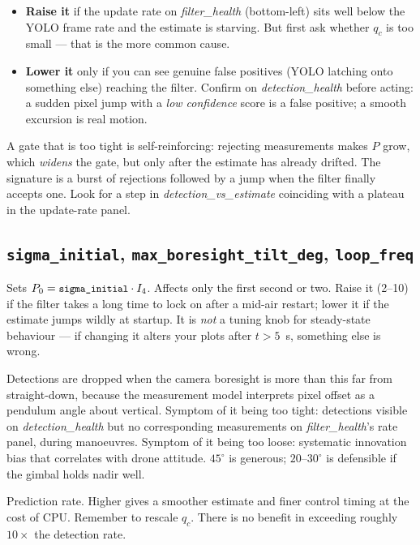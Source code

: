 \documentclass[11pt,a4paper]{article}
\newcommand{\param}[1]{\texttt{\small #1}}
\newcommand{\plot}[1]{\textit{#1}}
\begin{document}
\begin{itemize}[nosep]
  \item \textbf{Raise it} if the update rate on \plot{filter\_health}
        (bottom-left) sits well below the YOLO frame rate and the estimate is
        starving. But first ask whether $q_c$ is too small --- that is the more
        common cause.
  \item \textbf{Lower it} only if you can see genuine false positives (YOLO
        latching onto something else) reaching the filter. Confirm on
        \plot{detection\_health} before acting: a sudden pixel jump with a
        \emph{low confidence} score is a false positive; a smooth excursion is
        real motion.
\end{itemize}

\begin{tcolorbox}[colback=red!4,colframe=red!45!black,title=\textbf{Failure mode worth knowing},fonttitle=\bfseries\small]
A gate that is too tight is self-reinforcing: rejecting measurements makes $P$
grow, which \emph{widens} the gate, but only after the estimate has already
drifted. The signature is a burst of rejections followed by a jump when the
filter finally accepts one. Look for a step in \plot{detection\_vs\_estimate}
coinciding with a plateau in the update-rate panel.
\end{tcolorbox}

\subsection{\param{sigma\_initial}, \param{max\_boresight\_tilt\_deg},
\param{loop\_freq}}

\begin{description}[leftmargin=1.4cm,style=nextline]
\item[\param{sigma\_initial}] Sets $P_0=\param{sigma\_initial}\cdot I_4$.
Affects only the first second or two. Raise it (2--10) if the filter takes a
long time to lock on after a mid-air restart; lower it if the estimate jumps
wildly at startup. It is \emph{not} a tuning knob for steady-state behaviour ---
if changing it alters your plots after $t>5$~s, something else is wrong.

\item[\param{max\_boresight\_tilt\_deg}] Detections are dropped when the camera
boresight is more than this far from straight-down, because the measurement
model interprets pixel offset as a pendulum angle about vertical. Symptom of it
being too tight: detections visible on \plot{detection\_health} but no
corresponding measurements on \plot{filter\_health}'s rate panel, during
manoeuvres. Symptom of it being too loose: systematic innovation bias that
correlates with drone attitude. $45^\circ$ is generous; $20$--$30^\circ$ is
defensible if the gimbal holds nadir well.

\item[\param{loop\_freq}] Prediction rate. Higher gives a smoother estimate and
finer control timing at the cost of CPU. Remember to rescale $q_c$. There is no
benefit in exceeding roughly $10\times$ the detection rate.
\end{description}
\end{document}
